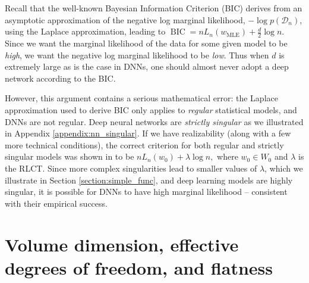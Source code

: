 \documentclass{article} %
\begin{document}
Recall that the well-known Bayesian Information Criterion (BIC) derives from an asymptotic approximation of the negative log marginal likelihood, $-\log p(\mathcal D_n)$, using the Laplace approximation, leading to
$
\operatorname{BIC} = nL_n( w_{\operatorname{MLE}}) + \frac{d}{2} \log n.
$
Since we want the marginal likelihood of the data for some given model to be \textit{high}, we want the negative log marginal likelihood to be \textit{low}. Thus when $d$ is extremely large as is the case in DNNs, one should almost never adopt a deep network according to the BIC. 

However, this argument contains a serious mathematical error: the Laplace approximation used to derive BIC only applies to \emph{regular} statistical models, and DNNs are not regular. Deep neural networks are \textit{strictly singular} as we illustrated in Appendix \ref{appendix:nn_singular}. 
If we have realizability (along with a few more technical conditions), the correct criterion for both regular and strictly singular models was shown in \citet{watanabe_widely_2013} to be 
$
nL_n(w_0) + \lambda \log n,
$
where $w_0 \in W_0$ and $\lambda$ is the RLCT. 
Since more complex singularities lead to smaller values of $\lambda$, which we illustrate in Section \ref{section:simple_func}, and deep learning models are highly singular, it is possible for DNNs to have high marginal likelihood -- consistent with their empirical success. 


\section{Volume dimension, effective degrees of freedom, and flatness}
\label{section:no_flat_minima}
\end{document}
